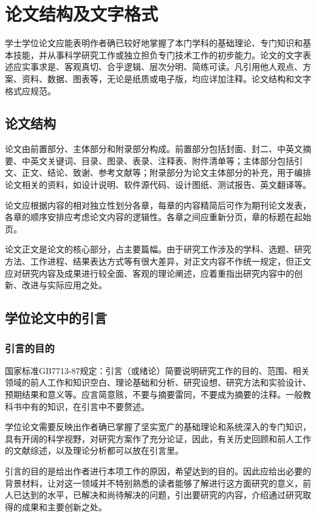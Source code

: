 
\chapter{论文结构及文字格式}
学士学位论文应能表明作者确已较好地掌握了本门学科的基础理论、专门知识和基本技能，并从事科学研究工作或独立担负专门技术工作的初步能力。论文的文字表述应实事求是、客观真切、合乎逻辑、层次分明、简练可读。凡引用他人观点、方案、资料、数据、图表等，无论是纸质或电子版，均应详加注释。论文结构和文字格式应规范。
\section{论文结构}
论文由前置部分、主体部分和附录部分构成。前置部分包括封面、封二、中英文摘要、中英文关键词、目录、图录、表录、注释表、附件清单等；主体部分包括引文、正文、结论、致谢、参考文献等；附录部分为论文主体部分的补充，用于编排论文相关的资料，如设计说明、软件源代码、设计图纸、测试报告、英文翻译等。

论文应根据内容的相对独立性划分各章，每章的内容精简后可作为期刊论文发表，各章的顺序安排应考虑论文内容的逻辑性。各章之间应重新分页，章的标题在起始页。

论文正文是论文的核心部分，占主要篇幅。由于研究工作涉及的学科、选题、研究方法、工作进程、结果表达方式等有很大差异，对正文内容不作统一规定，但正文应对研究内容及成果进行较全面、客观的理论阐述，应着重指出研究内容中的创新、改进与实际应用之处。


\section{学位论文中的引言}
\subsection{引言的目的}
国家标准GB7713-87规定：引言（或绪论）简要说明研究工作的目的、范围、相关领域的前人工作和知识空白、理论基础和分析、研究设想、研究方法和实验设计、预期结果和意义等。应言简意赅，不要与摘要雷同，不要成为摘要的注释。一般教科书中有的知识，在引言中不要赘述。

学位论文需要反映出作者确已掌握了坚实宽广的基础理论和系统深入的专门知识，具有开阔的科学视野，对研究方案作了充分论证，因此，有关历史回顾和前人工作的文献综述，以及理论分析都可以放在引言里。

引言的目的是给出作者进行本项工作的原因，希望达到的目的。因此应给出必要的背景材料，让对这一领域并不特别熟悉的读者能够了解进行这方面研究的意义，前人已达到的水平，已解决和尚待解决的问题，引出要研究的内容，介绍通过研究取得的成果和主要创新之处。



